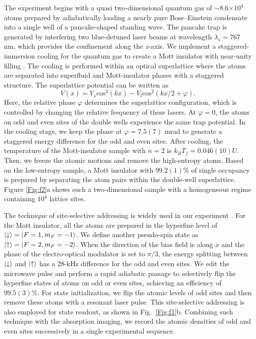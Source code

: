 \documentclass[aps,prl,twocolumn,superscriptaddress,footinbib,linenumbers]{revtex4}
\begin{document}
The experiment begins with a quasi two-dimensional quantum gas of $\sim$8.6$\times 10^4$ atoms prepared by adiabatically loading a nearly pure Bose--Einstein condensate into a single well of a pancake-shaped standing wave. The pancake trap is generated by interfering two blue-detuned laser beams at wavelength $\lambda_s = 767$ nm, which provides the confinement along the $z$-axis. We implement a staggered-immersion cooling for the quantum gas to create a Mott insulator with near-unity filling \cite{Yang:2019}. The cooling is performed within an optical superlattice where the atoms are separated into superfluid and Mott-insulator phases with a staggered structure. The superlattice potential can be written as
\begin{equation}
V(x)=V_s\mathrm{cos}^2(kx)-V_l\mathrm{cos} ^2(kx/2+\varphi).
\end{equation}
Here, the relative phase $\varphi$ determines the superlattice configuration, which is controlled by changing the relative frequency of these lasers. At $\varphi=0$, the atoms on odd and even sites of the double wells experience the same trap potential. In the cooling stage, we keep the phase at $\varphi = 7.5(7)$ mrad to generate a staggered energy difference for the odd and even sites. After cooling, the temperature of the Mott-insulator sample with $\overline{n}=2$ is $k_B T_f = 0.046(10) U$. Then, we freeze the atomic motions and remove the high-entropy atoms. Based on the low-entropy sample, a Mott insulator with $99.2(1) \%$ of single occupancy is prepared by separating the atom pairs within the double-well superlattice. Figure \ref{Fig:f2}a shows such a two-dimensional sample with a homogeneous regime containing $10^4$ lattice sites.


The technique of site-selective addressing is widely used in our experiment \cite{Yang:2017s,Yang:2019}. For the Mott insulator, all the atoms are prepared in the hyperfine level of $\ket{\downarrow}= \Ket{F=1, m_F=-1}$. We define another pseudo-spin state as $\ket{\uparrow}= \Ket{F=2, m_F=-2}$. When the direction of the bias field is along $x$ and the phase of the electro-optical modulator is set to $\pi/3$, the energy splitting between $\ket{\downarrow}$ and $\ket{\uparrow}$ has a $28$-kHz difference for the odd and even sites. We edit the microwave pulse and perform a rapid adiabatic passage to selectively flip the hyperfine states of atoms on odd or even sites, achieving an efficiency of $99.5(3)\%$. For state initialization, we flip the atomic levels of odd sites and then remove these atoms with a resonant laser pulse. This site-selective addressing is also employed for state readout, as shown in Fig.~\ref{Fig:f1}b.
Combining such technique with the absorption imaging, we record the atomic densities of odd and even sites successively in a single experimental sequence.
\end{document}
